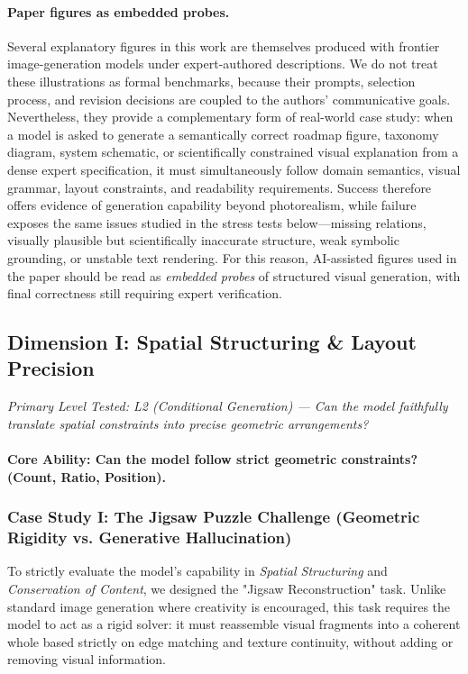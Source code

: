 \paragraph{Paper figures as embedded probes.}
Several explanatory figures in this work are themselves produced with frontier image-generation models under expert-authored descriptions. We do not treat these illustrations as formal benchmarks, because their prompts, selection process, and revision decisions are coupled to the authors' communicative goals. Nevertheless, they provide a complementary form of real-world case study: when a model is asked to generate a semantically correct roadmap figure, taxonomy diagram, system schematic, or scientifically constrained visual explanation from a dense expert specification, it must simultaneously follow domain semantics, visual grammar, layout constraints, and readability requirements. Success therefore offers evidence of generation capability beyond photorealism, while failure exposes the same issues studied in the stress tests below---missing relations, visually plausible but scientifically inaccurate structure, weak symbolic grounding, or unstable text rendering. For this reason, AI-assisted figures used in the paper should be read as \emph{embedded probes} of structured visual generation, with final correctness still requiring expert verification.


\subsection{Dimension I: Spatial Structuring \& Layout Precision}

\noindent\textit{Primary Level Tested: L2 (Conditional Generation) --- Can the model faithfully translate spatial constraints into precise geometric arrangements?}

\paragraph{Core Ability: Can the model follow strict geometric constraints? (Count, Ratio, Position).}

\subsubsection{Case Study I: The Jigsaw Puzzle Challenge (Geometric Rigidity vs. Generative Hallucination)}
\label{subsubsec:jigsaw_case}

To strictly evaluate the model's capability in \textit{Spatial Structuring} and \textit{Conservation of Content}, we designed the "Jigsaw Reconstruction" task. Unlike standard image generation where creativity is encouraged, this task requires the model to act as a rigid solver: it must reassemble visual fragments into a coherent whole based strictly on edge matching and texture continuity, without adding or removing visual information.

